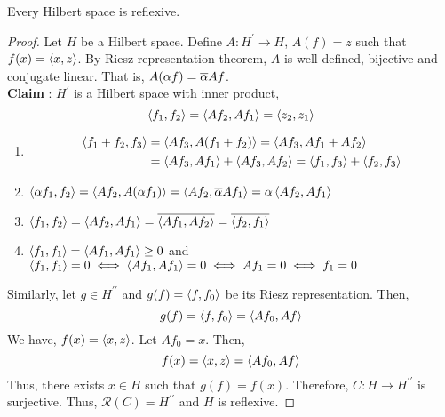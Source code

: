 \begin{theorem}
	Every Hilbert space is reflexive.
\end{theorem}
\begin{proof}
	Let $H$ be a Hilbert space.
	Define $A : H^\prime \to H$, $A(f) = z$ such that $f(x) = \left\langle x,z \right\rangle$.
	By Riesz representation theorem, $A$ is well-defined, bijective and conjugate linear.
	That is, $A(\alpha f) = \overline{\alpha}Af$.\\

	\textbf{Claim} : $H^\prime$ is a Hilbert space with inner product,
	\begin{equation}
		\left\langle f_1,f_2 \right\rangle = \left\langle Af_2,Af_1 \right\rangle = \left\langle z_2,z_1 \right\rangle 
	\end{equation}
	\begin{enumerate}[label=IP\arabic*]
		\item \begin{align*}
			\left\langle f_1+f_2,f_3 \right\rangle & = \left\langle Af_3,A(f_1+f_2) \right\rangle = \left\langle Af_3,Af_1+Af_2 \right\rangle \\
			& = \left\langle Af_3,Af_1 \right\rangle + \left\langle Af_3,Af_2 \right\rangle = \left\langle f_1,f_3 \right\rangle+\left\langle f_2,f_3 \right\rangle
		\end{align*}
		\item $\left\langle \alpha f_1,f_2 \right\rangle = \left\langle Af_2,A(\alpha f_1) \right\rangle = \left\langle Af_2,\overline{\alpha}Af_1 \right\rangle = \alpha \left\langle Af_2,Af_1 \right\rangle$
		\item $\left\langle f_1,f_2 \right\rangle = \left\langle Af_2,Af_1 \right\rangle = \overline{\left\langle Af_1,Af_2 \right\rangle} = \overline{\left\langle f_2,f_1 \right\rangle}$
		\item $\left\langle f_1,f_1 \right\rangle = \left\langle Af_1,Af_1 \right\rangle  \ge 0$ and \\
		$\left\langle f_1,f_1 \right\rangle = 0 \iff \left\langle Af_1,Af_1 \right\rangle = 0 \iff Af_1 = 0 \iff f_1 = 0$\\
	\end{enumerate}

	Similarly, let $g \in H^{\prime\prime}$ and $g(f) = \left\langle f,f_0 \right\rangle$ be its Riesz representation.
	Then,
	\[ g(f) = \left\langle f,f_0 \right\rangle = \left\langle Af_0,Af \right\rangle \] 
	We have, $f(x) = \left\langle x,z \right\rangle$.
	Let $Af_0 = x$.
	Then,
	\[ f(x) = \left\langle x,z \right\rangle = \left\langle Af_0,Af \right\rangle \]
	Thus, there exists $x \in H$ such that $g(f) = f(x)$.
	Therefore, $C : H \to H^{\prime\prime}$ is surjective.
	Thus, $\mathscr{R}(C) = H^{\prime\prime}$ and $H$ is reflexive.
\end{proof}

